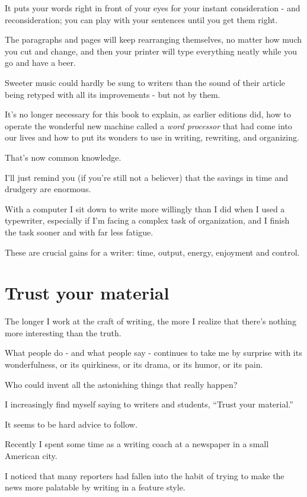\documentclass{book}
\numberwithin{equation}{section}
\begin{document}
It puts your words right in front of your eyes for your instant consideration - and reconsideration; you can play with your sentences until you get them right.

The paragraphs and pages will keep rearranging themselves, no matter how much you cut and change, and then your printer will type everything neatly while you go and have a beer.

Sweeter music could hardly be sung to writers than the sound of their article being retyped with all its improvements - but not by them.

%
It's no longer necessary for this book to explain, as earlier editions did, how to operate the wonderful new machine called a \textit{word processor} that had come into our lives and how to put its wonders to use in writing, rewriting, and organizing.

That's now common knowledge.

I'll just remind you (if you're still not a believer) that the savings in time and drudgery are enormous.

With a computer I sit down to write more willingly than I did when I used a typewriter, especially if I'm facing a complex task of organization, and I finish the task sooner and with far less fatigue.

These are crucial gains for a writer: time, output, energy, enjoyment and control.

\section{Trust your material}
The longer I work at the craft of writing, the more I realize that there's nothing more interesting than the truth.

What people do - and what people say - continues to take me by surprise with its wonderfulness, or its quirkiness, or its drama, or its humor, or its pain.

Who could invent all the astonishing things that really happen?

I increasingly find myself saying to writers and students, ``Trust your material.''

It seems to be hard advice to follow.

%
Recently I spent some time as a writing coach at a newspaper in a small American city.

I noticed that many reporters had fallen into the habit of trying to make the news more palatable by writing in a feature style.
\end{document}
